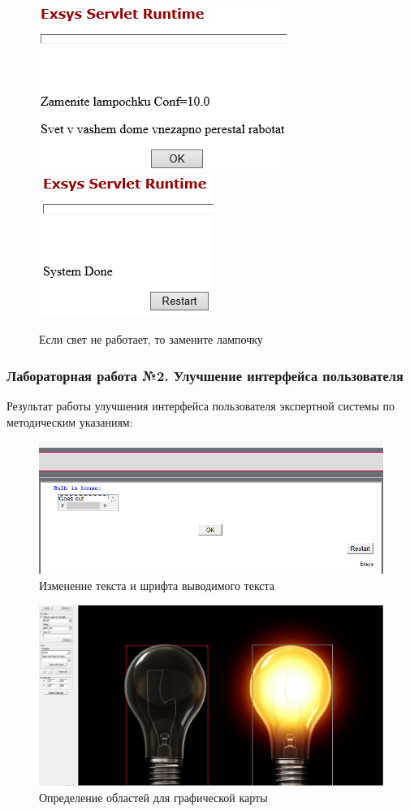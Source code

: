 \documentclass[14pt,a4paper,report]{report}
\begin{document}
\begin{figure}[ht!]
	\includegraphics[width=.35\textwidth]{images/1_4.png}\hfill
	\includegraphics[width=.35\textwidth]{images/1_6.png}
	\caption{Если свет не работает, то замените лампочку}
\end{figure}

\subsubsection{Лабораторная работа №2. Улучшение интерфейса пользователя}

Результат работы улучшения интерфейса пользователя экспертной системы по методическим указаниям:

\begin{figure}[h!]
	\centering
	\includegraphics[scale = 0.75]{images/2_1.png}
	\caption{Изменение текста и шрифта выводимого текста}
\end{figure}

\begin{figure}[h!]
	\centering
	\includegraphics[scale = 0.50]{images/2_2.png}
	\caption{Определение областей для графической карты}
\end{figure}
\end{document}
